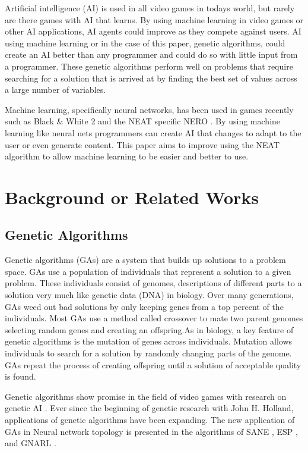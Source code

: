 \documentclass[12pt]{ucthesis} \newif\ifpdf \ifx\pdfoutput\undefined
\begin{document}
Artificial intelligence (AI) is used in all video games in todays world, but
rarely are there games with AI that learns. By using machine learning in video
games or other AI applications, AI agents could improve as they compete against
users.
AI using machine learning or in the case of this paper, genetic algorithms, could
create an AI better than any programmer and could do so with little input from a
programmer. These genetic algorithms perform well on problems that require
searching for a solution that is arrived at by finding the best set of values
across a large number of variables.

Machine learning, specifically neural networks, has been used in games recently
such as Black & White 2 and the NEAT specific NERO \cite{hastings2009evolving}.
By using machine learning like neural nets programmers can create AI that
changes to adapt to the user or even generate content. This paper aims to
improve using the NEAT algorithm to allow machine learning to be easier and
better to use. 
 

\chapter{Background or Related Works}


\section{Genetic Algorithms}

Genetic algorithms (GAs) are a system that builds up solutions to a problem
space. GAs use a population of individuals that represent a solution to a given
problem. These individuals consist of genomes, descriptions of different parts
to a solution very much like genetic data (DNA) in biology. Over many
generations, GAs weed out bad solutions by only keeping genes from a top percent
of the individuals. Most GAs use a method called crossover to mate two parent
genomes selecting random genes and creating an offspring.As in biology, a key
feature of genetic algorithms is the mutation of genes across individuals. 
Mutation allows individuals to search for a solution by randomly changing parts
of the genome. GAs repeat the process of creating offspring until a solution of
acceptable quality is found.

Genetic algorithms show promise in the field of video games with research on
genetic AI \cite{Revello,PengHuo,Chih-Sheng}. Ever since the beginning of
genetic research with John H. Holland, applications of genetic algorithms have
been expanding. The new application of GAs in Neural network topology is
presented in the algorithms of SANE \cite{moriarty:focus} , ESP
\cite{gomez:proposal} , and GNARL \cite{Angeline}.
\end{document}
